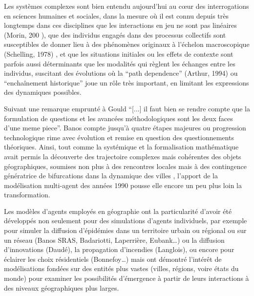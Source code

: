 Les systèmes complexes sont bien entendu aujourd'hui au cœur des interrogations en sciences humaines et sociales, dans la mesure où il est connu depuis très longtemps dans ces disciplines que les interactions en jeu ne sont pas linéaires   (Morin, 200 ), que des individus engagés dans des processus collectifs sont susceptibles de donner lieu à des phénomènes originaux à l’échelon macroscopique (Schelling, 1978) , et que les situations initiales ou les effets de contexte sont parfois aussi déterminants que les modalités qui règlent les échanges entre les individus, suscitant des évolutions où la \foreignquote{english}{path dependence}  (Arthur, 1994) ou \enquote{enchaînement historique} joue un rôle très important, en limitant les expressions des dynamiques possibles.

Suivant une remarque emprunté à Gould \autocite[31]{Gould2004} \enquote{[...] il faut bien se rendre compte que la formulation de questions et les avancées méthodologiques sont les deux faces d'une meme piece}. Banos \autocite{Banos2013} compte jusqu'à quatre étapes majeures ou progression technologique rime avec évolution et remise en question des questionnements théoriques. Ainsi, tout comme la systémique et la formalisation mathématique avait permis la découverte des trajectoire complexes mais cohérentes des objets géographiques, soumises non plus à des rencontres locales mais à des contingence génératrice de bifurcations dans la dynamique des villes \autocite[137]{Pumain2002}, l'apport de la modélisation multi-agent des années 1990 pousse elle encore un peu plus loin la transformation. \autocite{Sanders2007}


Les modèles d’agents employés en géographie ont la particularité d’avoir été développés non seulement pour des simulations d’agents individuels, par exemple pour simuler la diffusion d’épidémies dans un territoire urbain ou régional ou sur un réseau (Banos SRAS, Badariotti, Laperrière, Eubank…) ou la diffusion d’innovations (Daudé), la propagation d’incendies (Langlois), ou encore pour éclairer les choix résidentiels (Bonnefoy…) mais ont démontré l’intérêt de modélisations fondées sur des entités plus vastes (villes, régions, voire états du monde) pour examiner les possibilités d’émergence à partir de leurs interactions à des niveaux géographiques plus larges. 

